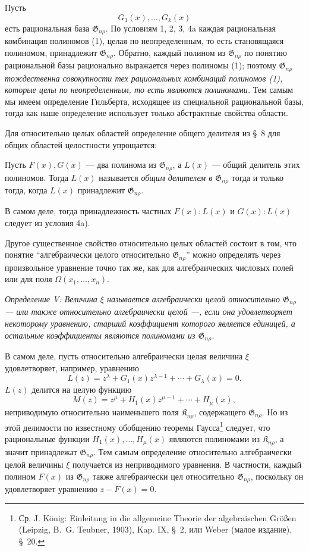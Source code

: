\documentclass[11pt]{article}
\providecommand{\Kfield}{\mathfrak{K}}
\providecommand{\Gdom}{\mathfrak{G}}
\begin{document}
Пусть
\begin{equation}
  G_1(x),\ldots,G_k(x)
\tag{1}
\end{equation}
есть рациональная база $\Gdom_{n\rho}$. По условиям 1, 2, 3, 4a каждая рациональная комбинация полиномов (1), целая по неопределенным, то есть становящаяся полиномом, принадлежит $\Gdom_{n\rho}$. Обратно, каждый полином из $\Gdom_{n\rho}$ по понятию рациональной базы рационально выражается через полиномы (1); поэтому $\Gdom_{n\rho}$ \emph{тождественна совокупности тех рациональных комбинаций полиномов (1), которые целы по неопределенным, то есть являются полиномами.} Тем самым мы имеем определение Гильберта, исходящее из специальной рациональной базы, тогда как наше определение использует только абстрактные свойства области.

Для относительно целых областей определение общего делителя из \S\ 8 для общих областей целостности упрощается:

Пусть $F(x),G(x)$ --- два полинома из $\Gdom_{n\rho}$, а $L(x)$ --- общий делитель этих полиномов. Тогда $L(x)$ называется \emph{общим делителем в $\Gdom_{n\rho}$} тогда и только тогда, когда $L(x)$ принадлежит $\Gdom_{n\rho}$.

В самом деле, тогда принадлежность частных $F(x):L(x)$ и $G(x):L(x)$ следует из условия 4a).

Другое существенное свойство относительно целых областей состоит в том, что понятие ``алгебраически целого относительно $\Gdom_{n\rho}$'' можно определять через произвольное уравнение точно так же, как для алгебраических числовых полей или для поля $\Omega(x_1,\ldots,x_n)$.

\emph{Определение V: Величина $\xi$ называется алгебраически целой относительно $\Gdom_{n\rho}$ --- или также относительно алгебраически целой ---, если она удовлетворяет некоторому уравнению, старший коэффициент которого является единицей, а остальные коэффициенты являются полиномами из $\Gdom_{n\rho}$.}

В самом деле, пусть относительно алгебраически целая величина $\xi$ удовлетворяет, например, уравнению
\[
  L(z)=z^\lambda+G_1(x)z^{\lambda-1}+\cdots+G_\lambda(x)=0.
\]
$L(z)$ делится на целую функцию
\[
  M(z)=z^\mu+H_1(x)z^{\mu-1}+\cdots+H_\mu(x),
\]
неприводимую относительно наименьшего поля $\Kfield_{n\rho}$, содержащего $\Gdom_{n\rho}$. Но из этой делимости по известному обобщению теоремы Гаусса\footnote{Ср. J. König: Einleitung in die allgemeine Theorie der algebraischen Größen (Leipzig, B.~G. Teubner, 1903), Kap. IX, \S\ 2, или Weber (малое издание), \S\ 20.} следует, что рациональные функции $H_1(x),\ldots,H_\mu(x)$ являются полиномами из $\Kfield_{n\rho}$, а значит принадлежат $\Gdom_{n\rho}$. Тем самым определение относительно алгебраически целой величины $\xi$ получается из неприводимого уравнения. В частности, каждый полином $F(x)$ из $\Gdom_{n\rho}$ также алгебраически цел относительно $\Gdom_{n\rho}$, поскольку он удовлетворяет уравнению $z-F(x)=0$.
\end{document}
